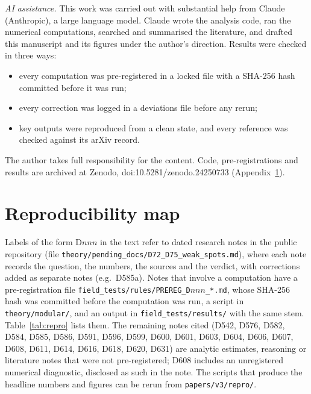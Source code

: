 \documentclass[aps,prd,twocolumn,superscriptaddress,nofootinbib,floatfix]{revtex4-2}
\begin{document}
\begin{acknowledgments}
\textit{AI assistance.} This work was carried out with substantial help from Claude (Anthropic), a large language model. Claude wrote the analysis code, ran the numerical computations, searched and summarised the literature, and drafted this manuscript and its figures under the author's direction. Results were checked in three ways:
\begin{itemize}
\item every computation was pre-registered in a locked file with a SHA-256 hash committed before it was run;
\item every correction was logged in a deviations file before any rerun;
\item key outputs were reproduced from a clean state, and every reference was checked against its arXiv record.
\end{itemize}
The author takes full responsibility for the content. Code, pre-registrations and results are archived at Zenodo, doi:10.5281/zenodo.24250733 (Appendix~\ref{app:repro}).
\end{acknowledgments}

\appendix
\section{Reproducibility map}\label{app:repro}
Labels of the form D$nnn$ in the text refer to dated research notes in the public repository (file \texttt{theory/pending\_docs/D72\_D75\_weak\_spots.md}), where each note records the question, the numbers, the sources and the verdict, with corrections added as separate notes (e.g.\ D585a). Notes that involve a computation have a pre-registration file \texttt{field\_tests/rules/PREREG\_D$nnn$\_*.md}, whose SHA-256 hash was committed before the computation was run, a script in \texttt{theory/modular/}, and an output in \texttt{field\_tests/results/} with the same stem. Table~\ref{tab:repro} lists them. The remaining notes cited (D542, D576, D582, D584, D585, D586, D591, D596, D599, D600, D601, D603, D604, D606, D607, D608, D611, D614, D616, D618, D620, D631) are analytic estimates, reasoning or literature notes that were not pre-registered; D608 includes an unregistered numerical diagnostic, disclosed as such in the note. The scripts that produce the headline numbers and figures can be rerun from \texttt{papers/v3/repro/}.
\end{document}
